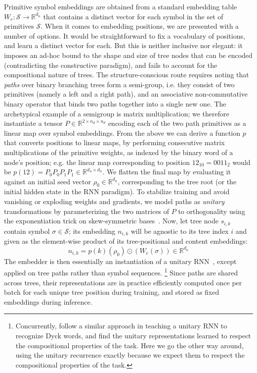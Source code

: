 Primitive symbol embeddings are obtained from a standard embedding table $W_e: \mathcal{S} \to \mathbb{R}^{d_n}$ that contains a distinct vector for each symbol in the set of primitives $\mathcal{S}$. 
When it comes to embedding positions, we are presented with a number of options.
It would be straightforward to fix a vocabulary of positions, and learn a distinct vector for each.
But this is neither inclusive nor elegant: it imposes an ad-hoc bound to the shape and size of tree nodes that can be encoded (contradicting the constructive paradigm), and fails to account for the compositional nature of trees.
The structure-conscious route requires noting that \textit{paths} over binary branching trees form a semi-group, i.e. they consist of two primitives (namely a left and a right path), and an associative non-commutative binary operator that binds two paths together into a single new one.
The archetypical example of a semigroup is matrix multiplication; we therefore instantiate a tensor $P \in \mathbb{R}^{2 \times n_d \times n_d}$ encoding each of the two path primitives as a linear map over symbol embeddings.
From the above we can derive a function $p$ that converts positions to linear maps, by performing consecutive matrix multiplications of the primitive weights, as indexed by the binary word of a node's position; e.g. the linear map corresponding to position $12_{10} = 0011_{2}$ would be $p(12) = P_0P_0P_1P_1 \in \mathbb{R}^{d_n \times d_n}$.
We flatten the final map by evaluating it against an initial seed vector $\rho_0 \in \mathbb{R}^{d_n}$, corresponding to the tree root (or the initial hidden state in the RNN paradigm).
To stabilize training and avoid vanishing or exploding weights and gradients, we model paths as \textit{unitary} transformations by parameterizing the two matrices of $P$ to orthogonality using the exponentiation trick on skew-symmetric bases~\cite{bader2019computing,lezcano2019trivializations}.
Now, let tree node $s_{i, k}$ contain symbol $\sigma \in \mathcal{S}$; its embedding $n_{i,k}$ will be agnostic to its tree index $i$ and given as the element-wise product of its tree-positional and content embeddings:
\begin{equation}
n_{i, k} = p(k)(\rho_0) \odot \left(W_e(\sigma)\right) \in \mathbb{R}^{d_n}
\end{equation}
The embedder is then essentially an instantiation of a unitary RNN~\cite{arjovsky2016unitary}, except applied on tree paths rather than symbol sequences.%
	\footnote{Concurrently, \citet{bernardy2022assessing} follow a similar approach in teaching a unitary RNN to recognize Dyck words, and find the unitary representations learned to respect the compositional properties of the task.
	Here we go the other way around, using the unitary recurrence exactly because we expect them to respect the compositional properties of the task.}
Since paths are shared across trees, their representations are in practice efficiently computed once per batch for each unique tree position during training, and stored as fixed embeddings during inference.

